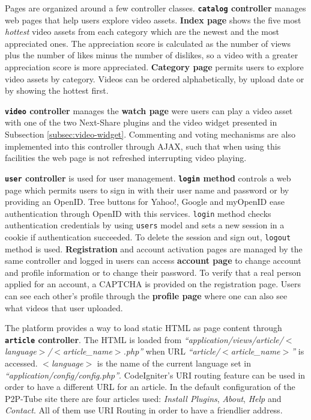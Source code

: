 Pages are organized around a few controller classes. \textbf{\texttt{catalog} controller} manages web pages that help users explore video assets. \textbf{Index page} shows the five most \textit{hottest} video assets from each category which are the newest and the most appreciated ones. The appreciation score is calculated as the number of views plus the number of likes minus the number of dislikes, so a video with a greater appreciation score is more appreciated. \textbf{Category page} permits users to explore video assets by category. Videos can be ordered alphabetically, by upload date or by showing the hottest first.

\textbf{\texttt{video} controller} manages the \textbf{watch page} were users can play a video asset with one of the two Next-Share plugins and the video widget presented in Subsection \ref{subsec:video-widget}. Commenting and voting mechanisms are also implemented into this controller through AJAX, such that when using this facilities the web page is not refreshed interrupting video playing.

\textbf{\texttt{user} controller} is used for user management. \textbf{\texttt{login} method} controls a web page which permits users to sign in with their user name and password or by providing an OpenID. Tree buttons for Yahoo!, Google and myOpenID ease authentication through OpenID with this services. \texttt{login} method checks authentication credentials by using \texttt{users} model and sets a new session in a cookie if authentication succeeded. To delete the session and sign out, \texttt{logout} method is used. \textbf{Registration} and account activation pages are managed by the same controller and logged in users can access \textbf{account page} to change account and profile information or to change their password. To verify that a real person applied for an account, a CAPTCHA is provided on the registration page. Users can see each other's profile through the \textbf{profile page} where one can also see what videos that user uploaded.

The platform provides a way to load static HTML as page content through \textbf{\texttt{article} controller}. The HTML is loaded from \textit{``application/views/article/$<$language$>$/$<$article_name$>$.php''} when URL \textit{``article/$<$article_name$>$''} is accessed. \textit{$<$language$>$} is the name of the current language set in \textit{``application/config/config.php''}. CodeIgniter's URI routing feature can be used in order to have a different URL for an article. In the default configuration of the P2P-Tube site there are four articles used: \textit{Install Plugins}, \textit{About}, \textit{Help} and \textit{Contact}. All of them use URI Routing in order to have a friendlier address.

